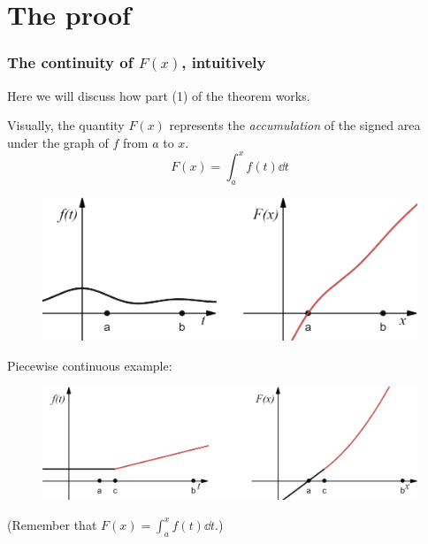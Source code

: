 \documentclass[mathserif]{beamer}
\begin{document}
\section{The proof}

\begin{frame}
  \frametitle{The continuity of $F(x)$, intuitively}
  Here we will discuss how part (1) of the theorem works.
  
  Visually, the quantity $F(x)$ represents the \textit{accumulation} of the signed area under the graph of $f$ from $a$ to $x$. $$F(x) = \int_a^x f(t)\dd{t}$$

  \begin{figure}[h]
    \centering
    \includegraphics[scale=0.33]{accumulation}
  \end{figure}

\end{frame}

\begin{frame}
  Piecewise continuous example:

  \begin{figure}[h]
    \centering
    \includegraphics[scale=0.3]{piecewise}
  \end{figure}

  (Remember that $F(x) = \int_a^x f(t)\dd{t}$.)

\end{frame}
\end{document}
